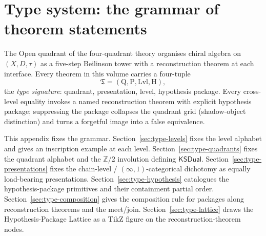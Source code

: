 
\providecommand{\BeilLevel}{\mathrm{Lvl}}
\providecommand{\Quad}{\mathrm{Q}}
\providecommand{\Pres}{\mathrm{P}}
\providecommand{\Hyp}{\mathrm{H}}
\providecommand{\TypeSig}{\mathfrak{T}}
\providecommand{\Open}{\mathsf{Open}}
\providecommand{\KSDual}{\mathsf{KSDual}}
\providecommand{\Catl}{\mathsf{Cat}}
\providecommand{\Chnl}{\mathsf{Chain}}
\providecommand{\HypAug}{\mathsf{Aug}}
\providecommand{\HypComp}{\mathsf{Comp}}
\providecommand{\HypFinDimGr}{\mathsf{FDG}}
\providecommand{\HypKosz}{\mathsf{Kosz}}
\providecommand{\HypAmb}{\mathsf{Amb}}
\providecommand{\HypGen}{\mathsf{Gen}}
\providecommand{\HypClass}{\mathsf{Cl}}
\providecommand{\HypProConil}{\mathsf{ProConil}}
\providecommand{\HypJad}{\mathsf{J\text{-}adic}}
\providecommand{\HypWtComp}{\mathsf{WtComp}}
\providecommand{\HypCoder}{\mathsf{Coder}}
\providecommand{\HypMC}{\mathsf{MC}}
\providecommand{\HypMod}{\mathsf{Mod}}
\providecommand{\HypClut}{\mathsf{Clut}}
\providecommand{\HypHall}{\mathsf{Hall}}
\providecommand{\HypIntegral}{\mathsf{Int}}
\providecommand{\HypDescent}{\mathsf{Desc}}
\providecommand{\Recon}{\mathrm{Rec}}
\providecommand{\meet}{\sqcap}
\providecommand{\joinp}{\sqcup}
\providecommand{\Ab}{\mathcal{A}_b}

\chapter[Type system]{Type system: the grammar of theorem statements}
\label{app:type-system}

The Open quadrant of the four-quadrant theory organises chiral
algebra on $(X,D,\tau)$ as a five-step Beilinson tower with a
reconstruction theorem at each interface. Every theorem in this
volume carries a four-tuple
\[
 \TypeSig
 = (\Quad,\Pres,\BeilLevel,\Hyp),
\]
the \emph{type signature}: quadrant, presentation, level, hypothesis
package. Every cross-level equality invokes a named reconstruction
theorem with explicit hypothesis package; suppressing the package
collapses the quadrant grid (shadow-object distinction) and turns a
forgetful image into a false equivalence.

This appendix fixes the grammar. Section~\ref{sec:type-levels} fixes
the level alphabet and gives an inscription example at each level.
Section~\ref{sec:type-quadrants} fixes the quadrant alphabet and the
$\mathbb{Z}/2$ involution defining $\KSDual$.
Section~\ref{sec:type-presentations} fixes the chain-level /
$(\infty,1)$-categorical dichotomy as equally load-bearing
presentations. Section~\ref{sec:type-hypothesis} catalogues the
hypothesis-package primitives and their containment partial order.
Section~\ref{sec:type-composition} gives the composition rule for
packages along reconstruction theorems and the meet/join.
Section~\ref{sec:type-lattice} draws the Hypothesis-Package Lattice
as a TikZ figure on the reconstruction-theorem nodes.

